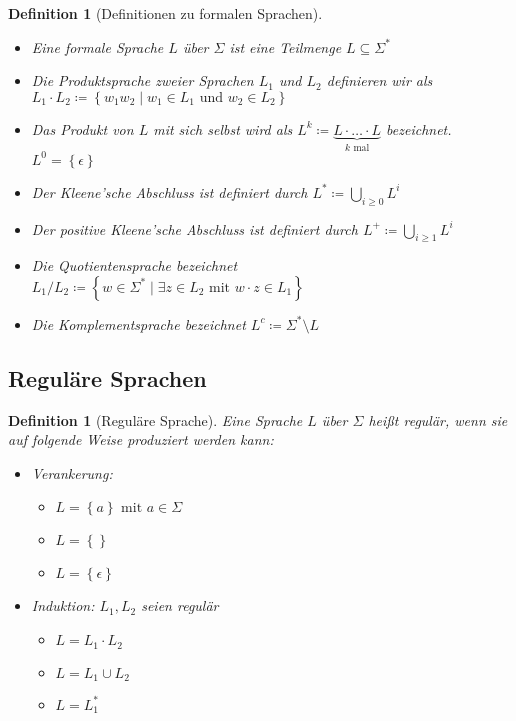 \documentclass[11pt]{scrartcl}
\newcommand{\set}[1]{\left\lbrace #1\right\rbrace}
\theoremstyle{break}
\newtheorem{defi}[satz]{Definition}
\begin{document}
    \begin{defi}[Definitionen zu formalen Sprachen]
        \begin{itemize}
            \item Eine formale Sprache $L$ über $\Sigma$ ist eine Teilmenge $L\subseteq\Sigma^*$
            \item Die Produktsprache zweier Sprachen $L_1$ und $L_2$ definieren wir als\\ $L_1\cdot L_2\coloneqq\set{w_{1}w_{2}\mid w_{1}\in L_{1}\text{ und } w_{2}\in L_2}$
            \item Das Produkt von $L$ mit sich selbst wird als $L^k\coloneqq \underbrace{L\cdot\dots\cdot L}_{k\text{ mal}}$ bezeichnet. $L^0 = \set{\epsilon}$
            \item Der Kleene'sche Abschluss ist definiert durch $L^*\coloneqq \bigcup\limits_{i\geq 0} L^i$
            \item Der positive Kleene'sche Abschluss ist definiert durch $L^+\coloneqq \bigcup\limits_{i\geq 1} L^i$
            \item Die Quotientensprache bezeichnet $L_1/L_2\coloneqq\set{w\in \Sigma^*\mid\exists z\in L_2\text{ mit } w\cdot z\in L_1}$
            \item Die Komplementsprache bezeichnet $L^c\coloneqq\Sigma^*\setminus L$
        \end{itemize}
    \end{defi}


    \subsection{Reguläre Sprachen}
	\label{subsec:reguläre-sprachen}

    \begin{defi}[Reguläre Sprache]
        Eine Sprache $L$ über $\Sigma$ heißt regulär, wenn sie auf folgende Weise produziert werden kann:
        \begin{itemize}
            \item Verankerung:
            \begin{itemize}
                \item $L=\set{a}\text{ mit } a\in\Sigma$
                \item $L=\set{}$
                \item $L=\set{\epsilon}$
            \end{itemize}
            \item Induktion: $L_1,L_2$ seien regulär
            \begin{itemize}
                \item $L=L_1\cdot L_2$
                \item $L=L_1\cup L_2$
                \item $L=L_1^*$
            \end{itemize}
        \end{itemize}
    \end{defi}
\end{document}
